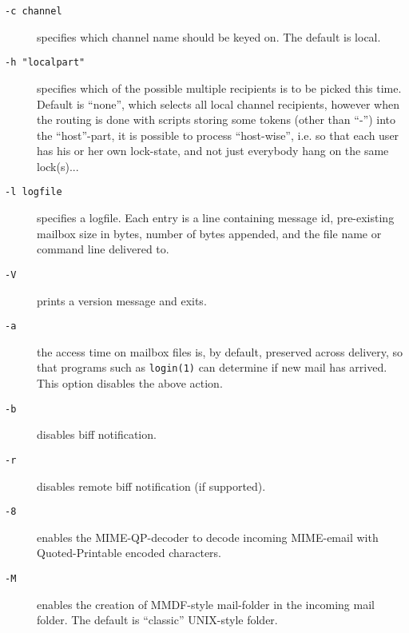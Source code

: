 \begin{description}
\item[{\tt -c channel}] \mbox{}

specifies which channel name should be keyed on. 
The default is local.

\item[{\tt -h "localpart"}] \mbox{}

specifies which of the possible multiple recipients is to 
be picked this time. Default is ``none'', which selects all local channel recipients, 
however when the routing is done with scripts storing some tokens (other than ``-'') 
into the ``host''-part, it is possible to process ``host-wise'', i.e. so that each 
user has his or her own lock-state, and not just everybody hang on the same lock(s)...

\item[{\tt -l logfile}] \mbox{}

specifies a logfile. Each entry is a line containing message 
id, pre-existing mailbox size in bytes, number of bytes appended, and the file name or 
command line delivered to.

\item[{\tt -V}] \mbox{}

prints a version message and exits.

\item[{\tt -a}] \mbox{}

the access time on mailbox files is, by default, preserved across
delivery, so that programs such as {\tt login(1)} can determine if new
mail has arrived. This option disables the above action.

\item[{\tt -b}] \mbox{}

disables biff notification.

\item[{\tt -r}] \mbox{}

disables remote biff notification (if supported).

\item[{\tt -8}] \mbox{}

enables the MIME-QP-decoder to decode incoming  MIME-email with
Quoted-Printable encoded characters.

\item[{\tt -M}] \mbox{}

enables the creation of MMDF-style mail-folder in the  incoming
mail folder. The default is ``classic'' UNIX-style folder.

\end{description}


